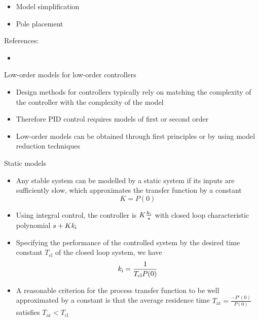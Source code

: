 \documentclass[10pt]{beamer-control}
\begin{document}

\begin{SUMMARY}
  \begin{itemize}
    \item Model simplification
    \item Pole placement
  \end{itemize}
  \vfill References:
  \begin{itemize}
    \item \astrom[§11.2]
  \end{itemize}
\end{SUMMARY}




\begin{frame}{Low-order models for low-order controllers}
  \begin{itemize}
    \item Design methods for controllers typically rely on matching the complexity of the controller with the complexity of the model
    \item Therefore PID control requires models of first or second order
    \item Low-order models can be obtained through first principles or by using model reduction techniques
  \end{itemize}
\end{frame}

\begin{frame}{Static models}
  \begin{itemize}
    \item Any stable system can be modelled by a static system if its inputs are sufficiently slow, which approximates the transfer function by a constant
      \begin{equation}
        K=P(0)
      \end{equation}
    \item Using integral control, the controller is $K\tfrac{k_{\mathrm{i}}}{s}$ with closed loop characteristic polynomial $s+Kk_{\mathrm{i}}$
    \item Specifying the performance of the controlled system by the desired time constant $T_{\text{cl}}$ of the closed loop system, we have
      \begin{equation}
        k_{\mathrm{i}} = \frac{1}{T_{\text{cl}} P(0)}
      \end{equation}
    \item A reasonable criterion for the process transfer function to be well approximated by a constant is that the average residence time $T_{\text{ar}}=\tfrac{-P'(0)}{P(0)}$ satisfies $T_{\text{ar}}<T_{\text{cl}}$
  \end{itemize}
\end{frame}
\end{document}

